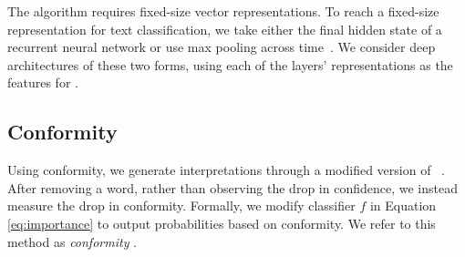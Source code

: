 The \dknn{} algorithm requires fixed-size vector representations. 
To reach a fixed-size representation for text classification,
we take either the final hidden state of a
recurrent neural network or use max pooling across
time~\cite{collobert2008unified}. We consider deep architectures
of these two forms, using each of the layers' representations as the 
features for \dknn{}.

\subsection{Conformity \loo{}}
\label{sec:cred_l1o}

Using conformity, we generate interpretations through a modified
version of \loo{}~\cite{li2016understanding}. After removing a word,
rather than observing the drop in confidence, we instead
measure the drop in conformity. Formally, we
modify classifier $f$ in Equation \ref{eq:importance} to
output probabilities based on conformity. 
We refer to this method as \textit{conformity \loo{}}.
